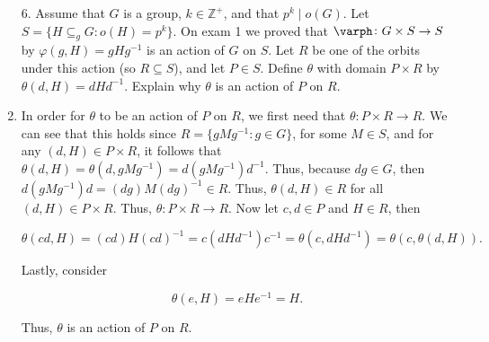 \documentclass[12pt]{article}
\makeatletter
\theoremstyle{definition}
\theoremstyle{remark}
\renewenvironment{proof}[1][\proofname]{\par
  \pushQED{\qed}%
  \normalfont \topsep6\p@\@plus6\p@\relax
  \list{}{\leftmargin=0mm
          \rightmargin=4mm
          \settowidth{\itemindent}{\itshape#1}%
          \labelwidth=\itemindent
          \parsep=0pt \listparindent=\parindent 
  }
  \item[\hskip\labelsep
        \itshape
    #1\@addpunct{.}]\ignorespaces
}{%
  \popQED\endlist\@endpefalse
}
\let\oldproofname=\proofname
\renewcommand{\proofname}{\bf{\textit{\oldproofname}}}
\makeatother
\begin{document}
\begin{enumerate}[leftmargin=*]
    \item[6.] Assume that $G$ is a group, $k\in\mathbb{Z}^{+}$, and that $p^k\mid o(G)$. Let $S=\{H\subseteq_g G\colon o(H)=p^k\}$. On exam 1 we proved that $\varph\colon G\times S\rightarrow S$ by $\varphi(g,H)=gHg^{-1}$ is an action of $G$ on $S$. Let $R$ be one of the orbits under this action (so $R\subseteq S$), and let $P\in S$. Define $\theta$ with domain $P\times R$ by $\theta(d,H)=dHd^{-1}$. Explain why $\theta$ is an action of $P$ on $R$.
        \begin{proof}
            In order for $\theta$ to be an action of $P$ on $R$, we first need that $\theta\colon P\times R\rightarrow R$. We can see that this holds since $R=\{gMg^{-1}\colon g\in G\}$, for some $M\in S$, and for any $(d,H)\in P\times R$, it follows that $\theta(d,H)=\theta(d,gMg^{-1})=d(gMg^{-1})d^{-1}$. Thus, because $dg\in G$, then $d(gMg^{-1})d=(dg)M(dg)^{-1}\in R$. Thus, $\theta(d,H)\in R$ for all $(d,H)\in P\times R$. Thus, $\theta\colon P\times R\rightarrow R$. Now let $c,d\in P$ and $H\in R$, then 
            
            \begin{equation*}
                \theta(cd, H)=(cd)H(cd)^{-1}=c(dHd^{-1})c^{-1}=\theta(c,dHd^{-1})=\theta(c,\theta(d,H)).
            \end{equation*}
            
            Lastly, consider
            
            \begin{equation*}
                \theta(e,H)=eHe^{-1}=H.
            \end{equation*}
            
            Thus, $\theta$ is an action of $P$ on $R$.
        \end{proof}
\end{enumerate}
\end{document}
